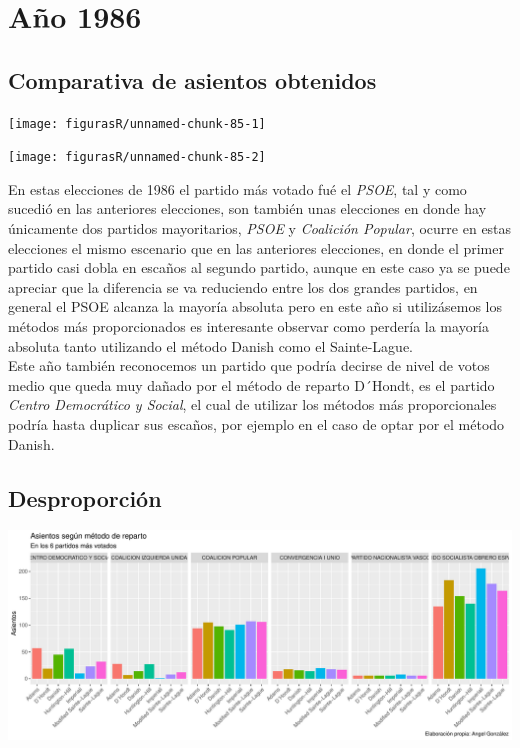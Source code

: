 \documentclass[12pt,a4paper,]{book}
\numberwithin{dummy}{section}
\theoremstyle{ocrenumbox}
\theoremstyle{blacknumex}
\theoremstyle{blacknumbox}
\theoremstyle{ocrenum}
\theoremstyle{ocrenum}
\begin{document}
\hypertarget{auxf1o-1986}{%
\section{Año 1986}\label{auxf1o-1986}}

\hypertarget{comparativa-de-asientos-obtenidos-3}{%
\subsection{Comparativa de asientos
obtenidos}\label{comparativa-de-asientos-obtenidos-3}}

\begin{center}\texttt{[image: figurasR/unnamed-chunk-85-1]} \end{center}

\begin{center}\texttt{[image: figurasR/unnamed-chunk-85-2]} \end{center}

En estas elecciones de 1986 el partido más votado fué el \emph{PSOE},
tal y como sucedió en las anteriores elecciones, son también unas
elecciones en donde hay únicamente dos partidos mayoritarios,
\emph{PSOE} y \emph{Coalición Popular}, ocurre en estas elecciones el
mismo escenario que en las anteriores elecciones, en donde el primer
partido casi dobla en escaños al segundo partido, aunque en este caso ya
se puede apreciar que la diferencia se va reduciendo entre los dos
grandes partidos, en general el PSOE alcanza la mayoría absoluta pero en
este año si utilizásemos los métodos más proporcionados es interesante
observar como perdería la mayoría absoluta tanto utilizando el método
Danish como el Sainte-Lague.\\
Este año también reconocemos un partido que podría decirse de nivel de
votos medio que queda muy dañado por el método de reparto D´Hondt, es el
partido \emph{Centro Democrático y Social}, el cual de utilizar los
métodos más proporcionales podría hasta duplicar sus escaños, por
ejemplo en el caso de optar por el método Danish.

\hypertarget{desproporciuxf3n-3}{%
\subsection{Desproporción}\label{desproporciuxf3n-3}}

\begin{center}\includegraphics[width=1\linewidth]{figurasR/unnamed-chunk-86-1} \end{center}
\end{document}
